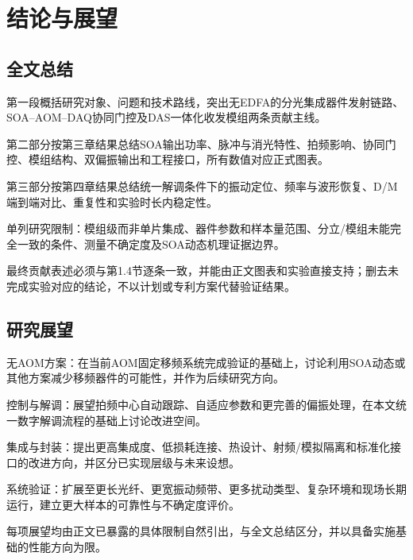 \chapter{结论与展望}

\section{全文总结}

\begin{writingplan}
  \item 第一段概括研究对象、问题和技术路线，突出无EDFA的分光集成器件发射链路、SOA--AOM--DAQ协同门控及DAS一体化收发模组两条贡献主线。
  \item 第二部分按第三章结果总结SOA输出功率、脉冲与消光特性、拍频影响、协同门控、模组结构、双偏振输出和工程接口，所有数值对应正式图表。
  \item 第三部分按第四章结果总结统一解调条件下的振动定位、频率与波形恢复、D/M端到端对比、重复性和实验时长内稳定性。
  \item 单列研究限制：模组级而非单片集成、器件参数和样本量范围、分立/模组未能完全一致的条件、测量不确定度及SOA动态机理证据边界。
  \item 最终贡献表述必须与第1.4节逐条一致，并能由正文图表和实验直接支持；删去未完成实验对应的结论，不以计划或专利方案代替验证结果。
\end{writingplan}

\section{研究展望}

\begin{writingplan}
  \item 无AOM方案：在当前AOM固定移频系统完成验证的基础上，讨论利用SOA动态或其他方案减少移频器件的可能性，并作为后续研究方向。
  \item 控制与解调：展望拍频中心自动跟踪、自适应参数和更完善的偏振处理，在本文统一数字解调流程的基础上讨论改进空间。
  \item 集成与封装：提出更高集成度、低损耗连接、热设计、射频/模拟隔离和标准化接口的改进方向，并区分已实现层级与未来设想。
  \item 系统验证：扩展至更长光纤、更宽振动频带、更多扰动类型、复杂环境和现场长期运行，建立更大样本的可靠性与不确定度评价。
  \item 每项展望均由正文已暴露的具体限制自然引出，与全文总结区分，并以具备实施基础的性能方向为限。
\end{writingplan}
